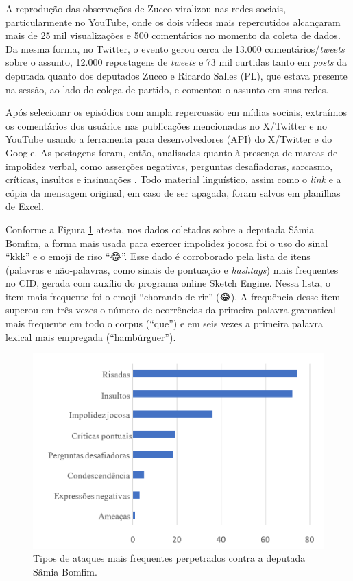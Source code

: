 \documentclass[portuguese]{textolivre}
\begin{document}
A reprodução das observações de Zucco viralizou nas redes sociais, particularmente no YouTube, onde os dois vídeos mais repercutidos alcançaram mais de 25 mil visualizações e 500 comentários no momento da coleta de dados. Da mesma forma, no Twitter, o evento gerou cerca de 13.000 comentários/\textit{tweets} sobre o assunto, 12.000 repostagens de \textit{tweets} e 73 mil curtidas tanto em \textit{posts} da deputada quanto dos deputados Zucco e Ricardo Salles (PL), que estava presente na sessão, ao lado do colega de partido, e comentou o assunto em suas redes.

Após selecionar os episódios com ampla repercussão em mídias sociais, extraímos os comentários dos usuários nas publicações mencionadas no X/Twitter e no YouTube usando a ferramenta para desenvolvedores (API) do X/Twitter e do Google. As postagens foram, então, analisadas quanto à presença de marcas de impolidez verbal, como asserções negativas, perguntas desafiadoras, sarcasmo, críticas, insultos e insinuações \cite{culpeper2011}. Todo material linguístico, assim como o \textit{link} e a cópia da mensagem original, em caso de ser apagada, foram salvos em planilhas de Excel.

Conforme a Figura \ref{graf-2} atesta, nos dados coletados sobre a deputada Sâmia Bomfim, a forma mais usada para exercer impolidez jocosa foi o uso do sinal ``kkk'' e o emoji de riso ``{\Symbola 😂}''.
Esse dado é corroborado pela lista de itens (palavras e não-palavras, como sinais de pontuação e \textit{hashtags}) mais frequentes no CID, gerada com auxílio do programa online Sketch Engine. Nessa lista, o item mais frequente foi o emoji ``chorando de rir'' ({\Symbola 😂}).
A frequência desse item superou em três vezes o número de ocorrências da primeira palavra gramatical mais frequente em todo o corpus (``que'') e em seis vezes a primeira palavra lexical mais empregada (``hambúrguer'').

\begin{figure}[h!]
\centering
\begin{minipage}{.70\textwidth}
\includegraphics[width=\textwidth]{Fig2.png}
\caption{Tipos de ataques mais frequentes perpetrados contra a deputada Sâmia Bomfim.}
\label{graf-2}
\end{minipage}
\end{figure}
\end{document}

